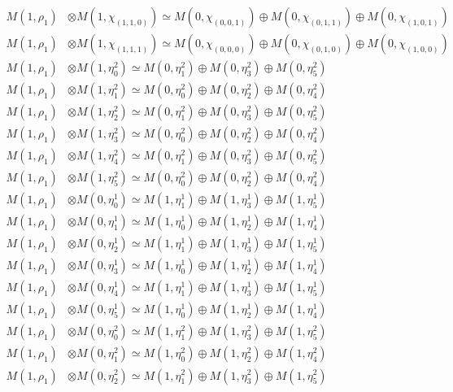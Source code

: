 \begin{align*}
M(1,\rho_{1}) &\otimes M(1,\chi_{(1,1,0)}) \simeq M(0,\chi_{(0,0,1)}) \oplus M(0,\chi_{(0,1,1)}) \oplus M(0,\chi_{(1,0,1)}) \\
M(1,\rho_{1}) &\otimes M(1,\chi_{(1,1,1)}) \simeq M(0,\chi_{(0,0,0)}) \oplus M(0,\chi_{(0,1,0)}) \oplus M(0,\chi_{(1,0,0)}) \\
M(1,\rho_{1}) &\otimes M(1,\eta^{2}_{0}) \simeq M(0,\eta^{2}_{1}) \oplus M(0,\eta^{2}_{3}) \oplus M(0,\eta^{2}_{5}) \\
M(1,\rho_{1}) &\otimes M(1,\eta^{2}_{1}) \simeq M(0,\eta^{2}_{0}) \oplus M(0,\eta^{2}_{2}) \oplus M(0,\eta^{2}_{4}) \\
M(1,\rho_{1}) &\otimes M(1,\eta^{2}_{2}) \simeq M(0,\eta^{2}_{1}) \oplus M(0,\eta^{2}_{3}) \oplus M(0,\eta^{2}_{5}) \\
M(1,\rho_{1}) &\otimes M(1,\eta^{2}_{3}) \simeq M(0,\eta^{2}_{0}) \oplus M(0,\eta^{2}_{2}) \oplus M(0,\eta^{2}_{4}) \\
M(1,\rho_{1}) &\otimes M(1,\eta^{2}_{4}) \simeq M(0,\eta^{2}_{1}) \oplus M(0,\eta^{2}_{3}) \oplus M(0,\eta^{2}_{5}) \\
M(1,\rho_{1}) &\otimes M(1,\eta^{2}_{5}) \simeq M(0,\eta^{2}_{0}) \oplus M(0,\eta^{2}_{2}) \oplus M(0,\eta^{2}_{4}) \\
M(1,\rho_{1}) &\otimes M(0,\eta^{1}_{0}) \simeq M(1,\eta^{1}_{1}) \oplus M(1,\eta^{1}_{3}) \oplus M(1,\eta^{1}_{5}) \\
M(1,\rho_{1}) &\otimes M(0,\eta^{1}_{1}) \simeq M(1,\eta^{1}_{0}) \oplus M(1,\eta^{1}_{2}) \oplus M(1,\eta^{1}_{4}) \\
M(1,\rho_{1}) &\otimes M(0,\eta^{1}_{2}) \simeq M(1,\eta^{1}_{1}) \oplus M(1,\eta^{1}_{3}) \oplus M(1,\eta^{1}_{5}) \\
M(1,\rho_{1}) &\otimes M(0,\eta^{1}_{3}) \simeq M(1,\eta^{1}_{0}) \oplus M(1,\eta^{1}_{2}) \oplus M(1,\eta^{1}_{4}) \\
M(1,\rho_{1}) &\otimes M(0,\eta^{1}_{4}) \simeq M(1,\eta^{1}_{1}) \oplus M(1,\eta^{1}_{3}) \oplus M(1,\eta^{1}_{5}) \\
M(1,\rho_{1}) &\otimes M(0,\eta^{1}_{5}) \simeq M(1,\eta^{1}_{0}) \oplus M(1,\eta^{1}_{2}) \oplus M(1,\eta^{1}_{4}) \\
M(1,\rho_{1}) &\otimes M(0,\eta^{2}_{0}) \simeq M(1,\eta^{2}_{1}) \oplus M(1,\eta^{2}_{3}) \oplus M(1,\eta^{2}_{5}) \\
M(1,\rho_{1}) &\otimes M(0,\eta^{2}_{1}) \simeq M(1,\eta^{2}_{0}) \oplus M(1,\eta^{2}_{2}) \oplus M(1,\eta^{2}_{4}) \\
M(1,\rho_{1}) &\otimes M(0,\eta^{2}_{2}) \simeq M(1,\eta^{2}_{1}) \oplus M(1,\eta^{2}_{3}) \oplus M(1,\eta^{2}_{5}) \\

\end{align*}
